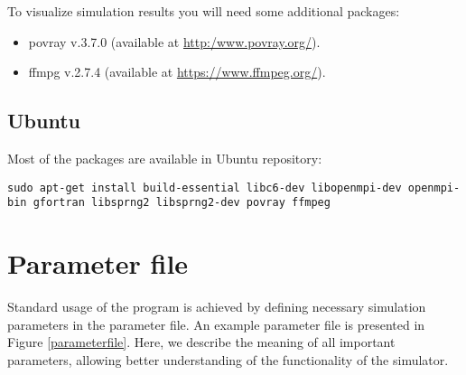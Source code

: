 \documentclass[10pt]{article}
\begin{document}
To visualize simulation results you will need some additional packages:
\begin{itemize}
\item povray v.3.7.0 (available at \url{http:/www.povray.org/}).
\item ffmpg v.2.7.4  (available at \url{https://www.ffmpeg.org/}).
\end{itemize}

\subsection{Ubuntu}

Most of the packages are available in Ubuntu repository:

{\tt sudo apt-get install build-essential libc6-dev libopenmpi-dev openmpi-bin gfortran libsprng2 libsprng2-dev povray ffmpeg}

\section{Parameter file}
\label{usage}

Standard usage of the program is achieved by defining necessary simulation parameters in the parameter file. An example parameter file is presented in Figure \ref{parameterfile}. Here, we describe the meaning of all important parameters, allowing better understanding of the functionality of the simulator. 
\end{document}
